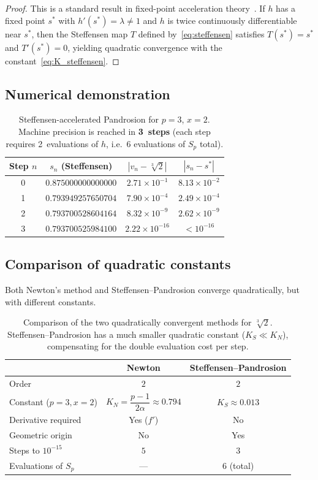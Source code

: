 \documentclass[10pt,a4paper,oneside]{book}
\theoremstyle{definition}
\theoremstyle{remark}
\newcommand{\cbrt}[1]{\sqrt[3]{#1}}
\begin{document}
\begin{proof}
This is a standard result in fixed-point acceleration theory~\cite{stoer}. If $h$ has a fixed point $s^*$ with $h'(s^*) = \lambda \neq 1$ and $h$ is twice continuously differentiable near $s^*$, then the Steffensen map $T$ defined by~\eqref{eq:steffensen} satisfies $T(s^*) = s^*$ and $T'(s^*) = 0$, yielding quadratic convergence with the constant~\eqref{eq:K_steffensen}.
\end{proof}

\subsection{Numerical demonstration}

\begin{table}[h]
\centering
\begin{tabular}{cccc}
\toprule
Step $n$ & $s_n$ (Steffensen) & $|v_n - \cbrt{2}|$ & $|s_n - s^*|$ \\
\midrule
0 & $0.875000000000000$ & $2.71 \times 10^{-1}$ & $8.13 \times 10^{-2}$ \\
1 & $0.793949257650704$ & $7.90 \times 10^{-4}$ & $2.49 \times 10^{-4}$ \\
2 & $0.793700528604164$ & $8.32 \times 10^{-9}$ & $2.62 \times 10^{-9}$ \\
3 & $0.793700525984100$ & $2.22 \times 10^{-16}$ & $< 10^{-16}$ \\
\bottomrule
\end{tabular}
\caption{Steffensen-accelerated Pandrosion for $p=3$, $x=2$. Machine precision is reached in \textbf{3~steps} (each step requires 2~evaluations of $h$, i.e.\ 6 evaluations of $S_p$ total).}
\end{table}

\subsection{Comparison of quadratic constants}

Both Newton's method and Steffensen--Pandrosion converge quadratically, but with different constants.

\begin{table}[h]
\centering
\renewcommand{\arraystretch}{1.3}
\begin{tabular}{lcc}
\toprule
& \textbf{Newton} & \textbf{Steffensen--Pandrosion} \\
\midrule
Order & $2$ & $2$ \\
Constant ($p\!=\!3, x\!=\!2$) & $K_N = \dfrac{p-1}{2\alpha} \approx 0.794$ & $K_S \approx 0.013$ \\
Derivative required & Yes ($f'$) & No \\
Geometric origin & No & Yes \\
Steps to $10^{-15}$ & $5$ & $3$ \\
Evaluations of $S_p$ & --- & $6$ (total) \\
\bottomrule
\end{tabular}
\caption{Comparison of the two quadratically convergent methods for $\cbrt{2}$. Steffensen--Pandrosion has a much smaller quadratic constant ($K_S \ll K_N$), compensating for the double evaluation cost per step.}
\end{table}
\end{document}
